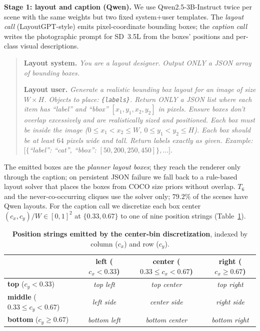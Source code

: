 \noindent\textbf{Stage 1: layout and caption (Qwen).}
We use Qwen2.5-3B-Instruct twice per scene with the same weights but two fixed system+user templates. The \emph{layout call} (LayoutGPT-style) emits pixel-coordinate bounding boxes; the \emph{caption call} writes the photographic prompt for SD~3.5L from the boxes' positions and per-class visual descriptions. 

\begin{quote}\small
\textbf{Layout system.} \emph{You are a layout designer. Output
ONLY a JSON array of bounding boxes.}

\medskip
\textbf{Layout user.} \emph{Generate a realistic bounding box layout for an image of size $W\!\times\!H$. Objects to place:
\texttt{\{labels\}}. Return ONLY a JSON list where each item has
``label'' and ``bbox'' $[x_1, y_1, x_2, y_2]$ in pixels. Ensure
boxes don't overlap excessively and are realistically sized and
positioned. Each box must be inside the image
($0 \leq x_1 < x_2 \leq W$, $0 \leq y_1 < y_2 \leq H$). Each box
should be at least $64$ pixels wide and tall. Return labels exactly
as given. Example: $[\{$``label'': ``cat'', ``bbox'': $[50, 200,
250, 450]\}, \dots]$.}
\end{quote}

The emitted boxes are the \emph{planner layout boxes}; they reach the renderer only through the caption; on persistent JSON failure we fall back to a rule-based layout solver that places the boxes from COCO size priors without overlap. $T_6$ and the never-co-occurring cliques use the solver only; $79.2\%$ of the scenes have Qwen layouts. For the caption call we
discretize each box center $(c_x, c_y)/W \in [0,1]^2$ at
$\{0.33, 0.67\}$ to one of nine position strings
(Table~\ref{tab:position_strings}).

\begin{table}[h!]
\centering\small
\caption{\textbf{Position strings emitted by the center-bin discretization}, indexed by column ($c_x$) and row ($c_y$).}
\label{tab:position_strings}
\begin{tabular}{lccc}
\toprule
 & \textbf{left} ($c_x{<}0.33$) & \textbf{center} ($0.33{\leq}c_x{<}0.67$) & \textbf{right} ($c_x{\geq}0.67$) \\
\midrule
\textbf{top} ($c_y{<}0.33$)        & \emph{top left}    & \emph{top center}    & \emph{top right} \\
\textbf{middle} ($0.33{\leq}c_y{<}0.67$) & \emph{left side}   & \emph{center side}   & \emph{right side} \\
\textbf{bottom} ($c_y{\geq}0.67$)  & \emph{bottom left} & \emph{bottom center} & \emph{bottom right} \\
\bottomrule
\end{tabular}
\end{table}

